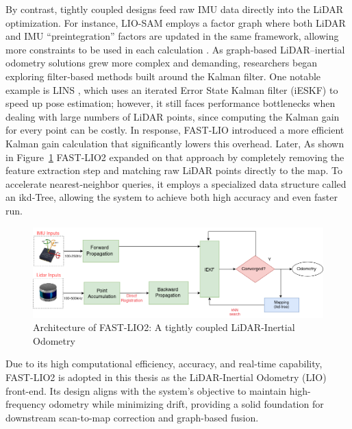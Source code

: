 By contrast, tightly coupled designs feed raw IMU data directly into the LiDAR optimization. For instance, LIO-SAM employs a factor graph where both LiDAR and IMU “preintegration” factors are updated in the same framework, allowing more constraints to be used in each calculation \cite{ShanEtAlLIOSAM2020}. As graph‐based LiDAR–inertial odometry solutions grew more complex and demanding, researchers began exploring filter‐based methods built around the Kalman filter. One notable example is LINS \cite{lins}, which uses an iterated Error State Kalman filter (iESKF) to speed up pose estimation; however, it still faces performance bottlenecks when dealing with large numbers of LiDAR points, since computing the Kalman gain for every point can be costly. In response, FAST‐LIO \cite{xuFastLIO2021} introduced a more efficient Kalman gain calculation that significantly lowers this overhead. Later, As shown in Figure~\ref{fig:fast_lio2_architecture} FAST‐LIO2 \cite{xuFastLIO2} expanded on that approach by completely removing the feature extraction step and matching raw LiDAR points directly to the map. To accelerate nearest‐neighbor queries, it employs a specialized data structure called an ikd‐Tree, allowing the system to achieve both high accuracy and even faster run.

\begin{figure}
    \centering
    \includegraphics[width=1 \linewidth]{images/fast_lio.drawio.png}
    \caption{Architecture of FAST-LIO2: A tightly coupled LiDAR-Inertial Odometry \cite{yin2021center}}
    \label{fig:fast_lio2_architecture}
\end{figure}

Due to its high computational efficiency, accuracy, and real-time capability, FAST-LIO2 is adopted in this thesis as the LiDAR-Inertial Odometry (LIO) front-end. Its design aligns with the system’s objective to maintain high-frequency odometry while minimizing drift, providing a solid foundation for downstream scan-to-map correction and graph-based fusion.

